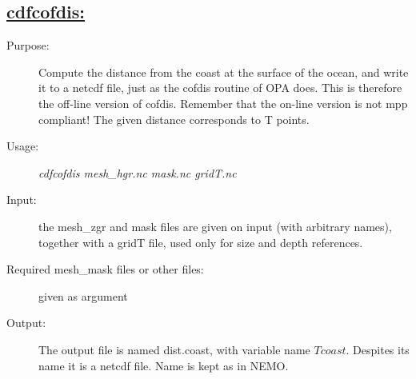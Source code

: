 \documentclass[a4paper,11pt]{article}
\begin{document}
\subsection*{\underline{cdfcofdis:}}
\begin{description}
\item[Purpose:] Compute the distance from the coast at the surface of the ocean, and write it to a netcdf file, just as the cofdis
routine of OPA does. This is therefore the off-line version of cofdis. Remember that the on-line version is not mpp compliant! The given distance corresponds to T points.
\item[Usage:] {\em cdfcofdis mesh\_hgr.nc  mask.nc gridT.nc }
\item[Input:] the mesh\_zgr and mask files are given on input (with arbitrary names), together with a gridT file, used only for size and depth references.
\item[Required mesh\_mask files or other files:] given as argument
\item[Output:]  The output file is named dist.coast, with variable name $Tcoast$. Despites its name it is a netcdf file. Name is kept as in NEMO.
\end{description}

\newpage
\end{document}
